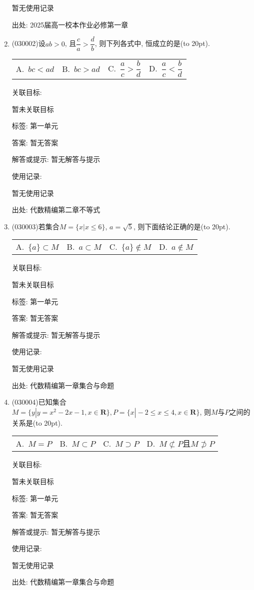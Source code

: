 \documentclass[10pt,a4paper]{article}
\newcommand{\bracket}[1]{(\hbox to #1pt{})}
\newcommand{\fourch}[4]{\par\begin{tabular}{p{.23\textwidth}p{.23\textwidth}p{.23\textwidth}p{.23\textwidth}}
A.~#1 &B.~#2& C.~#3& D.~#4
\end{tabular}}
\begin{document}
\begin{enumerate}[1.]
暂无使用记录


出处: 2025届高一校本作业必修第一章
\item { (030002)}设$ab>0$, 且$\dfrac ca>\dfrac db$, 则下列各式中, 恒成立的是\bracket{20}.
\fourch{$bc<ad$}{$bc>ad$}{$\dfrac ac>\dfrac bd$}{$\dfrac ac<\dfrac bd$}


关联目标:

暂未关联目标



标签: 第一单元

答案: 暂无答案

解答或提示: 暂无解答与提示

使用记录:

暂无使用记录


出处: 代数精编第二章不等式
\item { (030003)}若集合$M=\{x |x\le 6\}$, $a=\sqrt 5$, 则下面结论正确的是\bracket{20}.
\fourch{$\{ a\}\subset M$}{$a\subset M$}{$\{ a\}\notin M$}{$a\notin M$}


关联目标:

暂未关联目标



标签: 第一单元

答案: 暂无答案

解答或提示: 暂无解答与提示

使用记录:

暂无使用记录


出处: 代数精编第一章集合与命题
\item { (030004)}已知集合$M=\{y |y=x^2-2x-1,x\in \mathbf{R}\},P=\{x |-2\le x\le 4,x\in \mathbf{R}\}$, 则$M$与$P$之间的关系是\bracket{20}.
\fourch{$M=P$}{$M\subset P$}{$M\supset P$}{$M\not\subset P$且$M\not\supset P$}


关联目标:

暂未关联目标



标签: 第一单元

答案: 暂无答案

解答或提示: 暂无解答与提示

使用记录:

暂无使用记录


出处: 代数精编第一章集合与命题
\end{enumerate}
\end{document}
